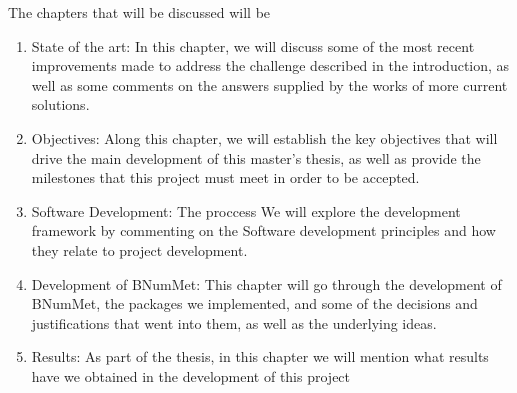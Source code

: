 The chapters that will be discussed will be
\begin{enumerate}
    \item State of the art:
    In this chapter, we will discuss some of the most recent improvements made to address the challenge described in the introduction, as well as some comments on the answers supplied by the works of more current solutions.

        
    \item Objectives: 
    Along this chapter, we will establish the key objectives that will drive the main development of this master's thesis, as well as provide the milestones that this project must meet in order to be accepted.

    
    
    \item Software Development: The proccess
    We will explore the development framework by commenting on the Software development principles and how they relate to project development.


    \item Development of BNumMet:
    This chapter will go through the development of BNumMet, the packages we implemented, and some of the decisions and justifications that went into them, as well as the underlying ideas.


        
    \item Results:
    As part of the thesis, in this chapter we will mention what results have we obtained in the development of this project
    

\end{enumerate}